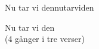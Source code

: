 \begin{song}{Nu tar vi den}{nutarviden}
\begin{vers}
\repopen Nu tar vi den \repclose\\
(4 gånger i tre verser)\\
\end{vers}
\end{song}
